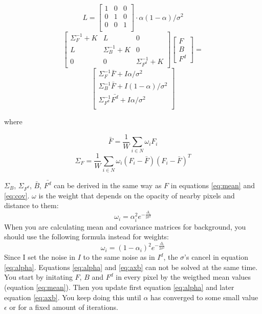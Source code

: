 \documentclass[10pt,letterpaper,twocolumn]{article}
\begin{document}
$$
L = 
\begin{bmatrix}
1 & 0 & 0 \\
0 & 1 & 0 \\
0 & 0 & 1 \\
\end{bmatrix} \cdot\alpha(1-\alpha)/\sigma^2
$$
$$
\begin{bmatrix}
\Sigma_F^{-1} + K & L & 0 \\
L & \Sigma_B^{-1} +  K & 0 \\ 
0 & 0 & \Sigma_{F^d}^{-1} +  K
\end{bmatrix}
\begin{bmatrix}
F\\
B\\
F^d
\end{bmatrix}
=
$$
$$
\begin{bmatrix}
\Sigma_F^{-1}\bar{F} + I\alpha/\sigma^2 \\
\Sigma_B^{-1}\bar{F} + I(1-\alpha)/\sigma^2 \\
\Sigma_{F^d}^{-1}\bar{F^d} + I\alpha/\sigma^2 \\
\end{bmatrix}
$$

where

\begin{equation}
\bar{F} = \frac{1}{W}\sum_{i\in{N}} \omega_i F_i
\label{eq:mean}
\end{equation}
\begin{equation}
\Sigma_F = \frac{1}{W}\sum_{i\in{N}} \omega_i (F_i - \bar{F})(F_i - \bar{F})^T
\label{eq:cov}
\end{equation}

$\Sigma_B$,  $\Sigma_{F^d}$, $\bar{B}$, $\bar{F^d}$ can be derived in the same way as $F$ in equations \ref{eq:mean} and \ref{eq:cov}. $\omega$ is the weight that depends on the opacity of nearby pixels and distance to them:
\begin{equation}
\omega_i = \alpha_i^2e^{-\frac{\Delta_i}{2\sigma^2}}
\end{equation}
When you are calculating mean and covariance matrices for background, you should use the following formula instead for weights:
\begin{equation}
\omega_i = (1-\alpha_i)^2e^{-\frac{\Delta_i}{2\sigma^2}}
\end{equation}
 Since I set the noise in $I$ to the same noise as in $I^d$, the $\sigma$'s cancel in equation \ref{eq:alpha}. Equations \ref{eq:alpha} and \ref{eq:axb} can not be solved at the same time. You start by initating $F$, $B$ and $F^d$ in every pixel by the weigthed mean values (equation \ref{eq:mean}). Then you update first equation \ref{eq:alpha} and later equation \ref{eq:axb}. You keep doing this until $\alpha$ has converged to some small value $\epsilon$ or for a fixed amount of iterations.
\end{document}

